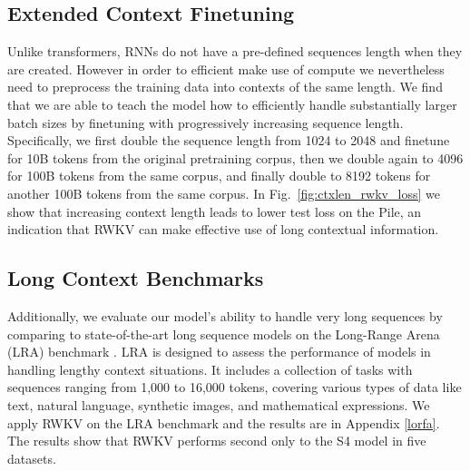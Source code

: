 \subsection{Extended Context Finetuning}

Unlike transformers, RNNs do not have a pre-defined sequences length when they are created. However in order to efficient make use of compute we nevertheless need to preprocess the training data into contexts of the same length. We find that we are able to teach the model how to efficiently handle substantially larger batch sizes by finetuning with progressively increasing sequence length. Specifically, we first double the sequence length from 1024 to 2048 and finetune for 10B tokens from the original pretraining corpus, then we double again to 4096 for 100B tokens from the same corpus, and finally double to 8192 tokens for another 100B tokens from the same corpus. In  Fig.~\ref{fig:ctxlen_rwkv_loss} we show that increasing context length leads to lower test loss on the Pile, an indication that RWKV can make effective use of long contextual information.

\subsection{Long Context Benchmarks}

Additionally, we evaluate our model's ability to handle very long sequences by comparing to state-of-the-art long sequence models on the Long-Range Arena (LRA) benchmark \cite{tay2021long}. LRA is designed to assess the performance of models in handling lengthy context situations. It includes a collection of tasks with sequences ranging from 1,000 to 16,000 tokens, covering various types of data like text, natural language, synthetic images, and mathematical expressions. We apply RWKV on the LRA benchmark and the results are in Appendix \ref{lorfa}. The results show that RWKV performs second only to the S4 model in five datasets.

